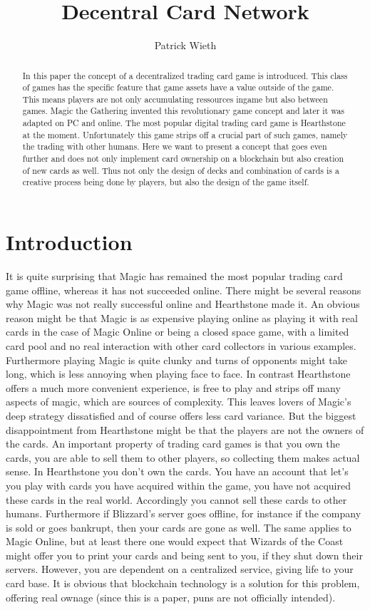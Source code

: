 \documentclass{article}
\title{Decentral Card Network}
\author{Patrick Wieth}
\begin{document}
\maketitle
%
\begin{abstract}
In this paper the concept of a decentralized trading card game is introduced. This class of games has the specific feature that game assets have a value outside of the game. This means players are not only accumulating ressources ingame but also between games. Magic the Gathering\cite{mtg} invented this revolutionary game concept and later it was adapted on PC and online. The most popular digital trading card game is Hearthstone\cite{Hearthstone} at the moment. Unfortunately this game strips off a crucial part of such games, namely the trading with other humans. Here we want to present a concept that goes even further and does not only implement card ownership on a blockchain but also creation of new cards as well. Thus not only the design of decks and combination of cards is a creative process being done by players, but also the design of the game itself. 
\end{abstract}
%
\section{Introduction}
%
It is quite surprising that Magic has remained the most popular trading card game offline, whereas it has not succeeded online. There might be several reasons why Magic was not really successful online and Hearthstone made it. An obvious reason might be that Magic is as expensive playing online as playing it with real cards in the case of Magic Online or being a closed space game, with a limited card pool and no real interaction with other card collectors in various examples. Furthermore playing Magic is quite clunky and turns of opponents might take long, which is less annoying when playing face to face. In contrast Hearthstone offers a much more convenient experience, is free to play and strips off many aspects of magic, which are sources of complexity. This leaves lovers of Magic's deep strategy dissatisfied and of course offers less card variance. But the biggest disappointment from Hearthstone might be that the players are not the owners of the cards. An important property of trading card games is that you own the cards, you are able to sell them to other players, so collecting them makes actual sense. In Hearthstone you don't own the cards. You have an account that let's you play with cards you have acquired within the game, you have not acquired these cards in the real world. Accordingly you cannot sell these cards to other humans. Furthermore if Blizzard's server goes offline, for instance if the company is sold or goes bankrupt, then your cards are gone as well. The same applies to Magic Online, but at least there one would expect that Wizards of the Coast might offer you to print your cards and being sent to you, if they shut down their servers. However, you are dependent on a centralized service, giving life to your card base. It is obvious that blockchain technology is a solution for this problem, offering real ownage (since this is a paper, puns are not officially intended). 
%
\end{document}
